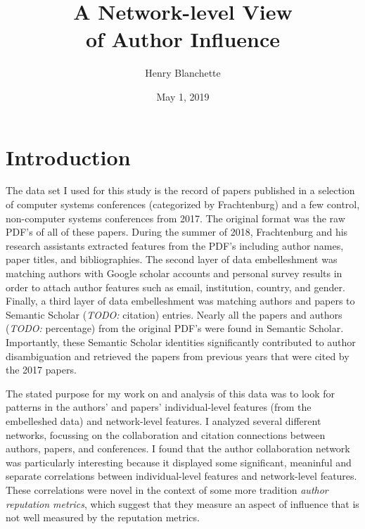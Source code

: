 \documentclass{article}
\title{\sc A Network-level View \\ of Author Influence}
\author{Henry Blanchette}
\date{May 1, 2019}
\newcommand{\todo}[1]{\textit{TODO:} #1}
\renewcommand{\it}{\textit}
\begin{document}

\maketitle


\section{Introduction}
\label{sec:introduction}

The data set I used for this study is the record of papers published in a selection of computer systems conferences (categorized by Frachtenburg) and a few control, non-computer systems conferences from 2017.
The original format was the raw PDF's of all of these papers.
During the summer of 2018, Frachtenburg and his research assistants extracted features from the PDF's including author names, paper titles, and bibliographies.
The second layer of data embelleshment was matching authors with Google scholar accounts and personal survey results in order to attach author features such as email, institution, country, and gender.
Finally, a third layer of data embelleshment was matching authors and papers to Semantic Scholar (\todo{citation}) entries.
Nearly all the papers and authors (\todo{percentage}) from the original PDF's were found in Semantic Scholar.
Importantly, these Semantic Scholar identities significantly contributed to author disambiguation and retrieved the papers from previous years that were cited by the 2017 papers.

The stated purpose for my work on and analysis of this data was to look for patterns in the authors' and papers' individual-level features (from the embelleshed data) and network-level features.
I analyzed several different networks, focussing on the collaboration and citation connections between authors, papers, and conferences.
I found that the author collaboration network was particularly interesting because it displayed some significant, meaninful and separate correlations between individual-level features and network-level features.
These correlations were novel in the context of some more tradition \it{author reputation metrics}, which suggest that they measure an aspect of influence that is not well measured by the reputation metrics.
\end{document}
